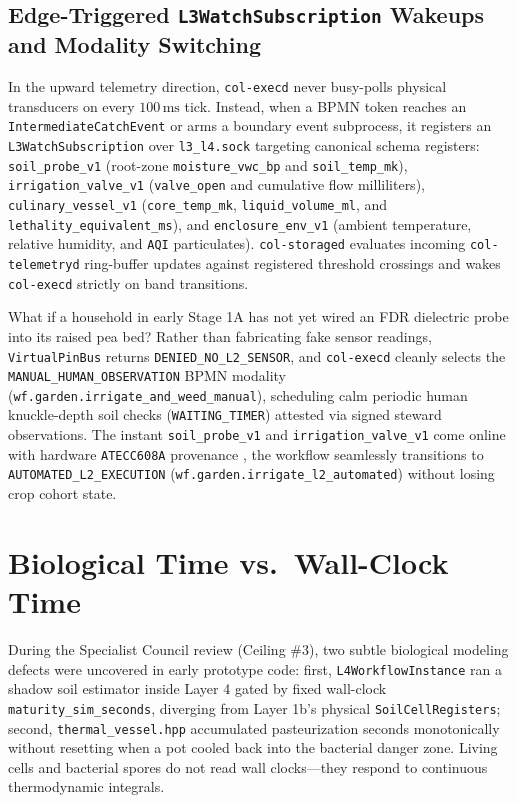 \subsection{Edge-Triggered \texttt{L3WatchSubscription} Wakeups and Modality Switching}

In the upward telemetry direction, \texttt{col-execd} never busy-polls physical transducers on
every $100\,\mathrm{ms}$ tick. Instead, when a BPMN token reaches an \texttt{IntermediateCatchEvent}
or arms a boundary event subprocess, it registers an \texttt{L3WatchSubscription} over
\texttt{l3\_l4.sock} targeting canonical schema registers: \texttt{soil\_probe\_v1} (root-zone
\texttt{moisture\_vwc\_bp} and \texttt{soil\_temp\_mk}), \texttt{irrigation\_valve\_v1}
(\texttt{valve\_open} and cumulative flow milliliters), \texttt{culinary\_vessel\_v1}
(\texttt{core\_temp\_mk}, \texttt{liquid\_volume\_ml}, and \texttt{lethality\_equivalent\_ms}),
and \texttt{enclosure\_env\_v1} (ambient temperature, relative humidity, and \texttt{AQI}
particulates). \texttt{col-storaged} evaluates incoming \texttt{col-telemetryd} ring-buffer
updates against registered threshold crossings and wakes \texttt{col-execd} strictly on band
transitions.

What if a household in early Stage 1A has not yet wired an FDR dielectric probe into its raised
pea bed? Rather than fabricating fake sensor readings, \texttt{VirtualPinBus} returns
\texttt{DENIED\_NO\_L2\_SENSOR}, and \texttt{col-execd} cleanly selects the
\texttt{MANUAL\_HUMAN\_OBSERVATION} BPMN modality (\texttt{wf.garden.irrigate\_and\_weed\_manual}),
scheduling calm periodic human knuckle-depth soil checks (\texttt{WAITING\_TIMER}) attested via
signed steward observations. The instant \texttt{soil\_probe\_v1} and \texttt{irrigation\_valve\_v1}
come online with hardware \texttt{ATECC608A} provenance \parencite{microchip_atecc608a}, the
workflow seamlessly transitions to \texttt{AUTOMATED\_L2\_EXECUTION}
(\texttt{wf.garden.irrigate\_l2\_automated}) without losing crop cohort state.

\section{Biological Time vs.\ Wall-Clock Time}
\label{sec:biological-vs-wallclock}

During the Specialist Council review (Ceiling \#3), two subtle biological modeling defects were
uncovered in early prototype code: first, \texttt{L4WorkflowInstance} ran a shadow soil
estimator inside Layer 4 gated by fixed wall-clock \texttt{maturity\_sim\_seconds}, diverging
from Layer 1b's physical \texttt{SoilCellRegisters}; second, \texttt{thermal\_vessel.hpp}
accumulated pasteurization seconds monotonically without resetting when a pot cooled back into
the bacterial danger zone. Living cells and bacterial spores do not read wall clocks---they
respond to continuous thermodynamic integrals.


